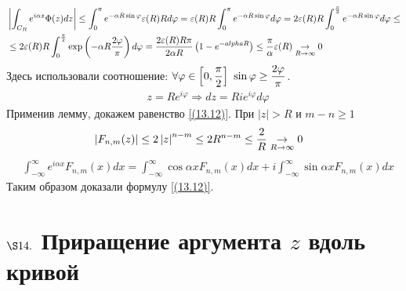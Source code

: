 \begin{align*}
  & \left| \int_{C_R}e^{i \alpha z}\Phi(z) dz \right| \leq \int_{0}^{\pi}e^{-\alpha R \sin \varphi}\varepsilon(R) R d \varphi = \varepsilon(R) R \int_{0}^{\pi}e^{-\alpha R \sin \varphi}d \varphi = 2 \varepsilon(R) R \int_{0}^{\frac{\pi}{2}}e^{-\alpha R \sin \varphi}d \varphi \leq \\
  & \leq 2 \varepsilon(R) R \int_{0}^{\frac{\pi}{2}}\exp\left( -\alpha R \frac{2 \varphi}{\pi} \right) d \varphi = \frac{2 \varepsilon(R) R \pi}{2 \alpha R}\left( 1 - e^{-alpha R} \right) \leq \frac{\pi}{\alpha} \varepsilon(R) \underset{R \to \infty}{\to} 0
\end{align*}
Здесь использовали соотношение: $\forall \varphi \in \left[ 0, \displaystyle
    \frac{\pi}{2} \right] \ \sin \varphi \geq \displaystyle \frac{2 \varphi}{\pi}$.
\begin{align*}
  & z = R e^{i \varphi} \Rightarrow dz = R i e^{i \varphi} d \varphi
\end{align*}
Применив лемму, докажем равенство \eqref{(13.12)}. При $\left| z \right| > R$ и
$m-n \geq 1$
\begin{align*}
  & \left| F_{n,m}(z) \right| \leq 2 \left| z \right|^{n-m} \leq 2 R^{n-m} \leq \frac{2}{R} \underset{R \to \infty}{\to} 0
\end{align*}
\begin{align*}
  & \int_{-\infty}^\infty e^{i \alpha x}F_{n,m}(x) dx = \int_{-\infty}^\infty \cos\alpha xF_{n,m}(x) dx + i \int_{-\infty}^\infty \sin \alpha x F_{n,m}(x) dx
\end{align*}
Таким образом доказали формулу \eqref{(13.12)}.
\section{$\S 14.$ Приращение аргумента $z$ вдоль кривой}